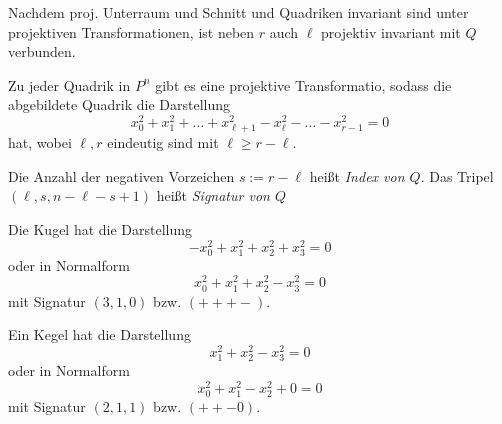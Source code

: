 \documentclass[11pt]{article}
\begin{document}
\maketitle
\begin{remark}
Nachdem proj. Unterraum und Schnitt und Quadriken invariant sind unter projektiven Transformationen, ist neben $r$ auch $\ell$ projektiv invariant mit $Q$ verbunden.
\end{remark}

\begin{theorem}
Zu jeder Quadrik in $P^n$ gibt es eine projektive Transformatio, sodass die abgebildete Quadrik die Darstellung \begin{equation*}
    x_0^2 + x_1^2 + \dots + x_{\ell+1}^2 - x_\ell^2 - \dots - x_{r-1}^2 = 0
\end{equation*}
hat, wobei $\ell , r$ eindeutig sind mit $\ell \geq r-\ell$.
\end{theorem}
\begin{definition}
Die Anzahl der negativen Vorzeichen $s:= r-\ell$ heißt \textit{Index von $Q$}. Das Tripel $(\ell, s, n-\ell-s+1)$ heißt \textit{Signatur von $Q$}
\end{definition}
\begin{example}
Die Kugel hat die Darstellung \begin{equation*}
    -x_0^2 + x_1^2+x_2^2+x_3^2 = 0
\end{equation*}
oder in Normalform
\begin{equation*}
    x_0^2 + x_1^2+x_2^2-x_3^2 = 0
\end{equation*}
mit Signatur $(3,1,0)$ bzw. $(+++-)$.
\end{example}
\begin{example}
Ein Kegel hat die Darstellung\begin{equation*}
    x_1^2+x_2^2-x_3^2 = 0
\end{equation*}
oder in Normalform
\begin{equation*}
    x_0^2 + x_1^2-x_2^2+ 0 = 0
\end{equation*}
mit Signatur $(2,1,1)$ bzw. $(++-0)$.
\end{example}
\end{document}
